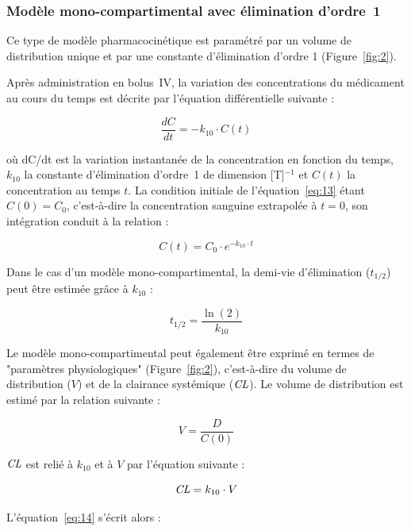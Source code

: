 \subsubsection{Modèle mono-compartimental avec élimination d'ordre~1}
Ce type de modèle pharmacocinétique est paramétré par un volume de distribution unique et par une constante d'élimination d'ordre 1 (Figure~\ref{fig:2}).

Après administration en bolus~IV, la variation des concentrations du médicament au cours du temps est décrite par l'équation différentielle suivante :

\begin{equation}
\frac{dC}{dt} = -k_{10} \cdot C(t)
\label{eq:13}
\end{equation}

où dC/dt est la variation instantanée de la concentration en fonction du temps, $k_{10}$ la constante d'élimination d'ordre~1 de dimension [T]$^{-1}$ et $C(t)$ la concentration au temps $t$. La condition initiale de l'équation~\ref{eq:13} étant $C(0) = C_0$, c'est-à-dire la concentration sanguine extrapolée à $t = 0$, son intégration conduit à la relation :

\begin{equation}
C(t) = C_0 \cdot e^{-k_{10}\cdot t}
\label{eq:14}
\end{equation}

Dans le cas d'un modèle mono-compartimental, la demi-vie d'élimination ($t_{1/2}$) peut être estimée grâce à $k_{10}$ :

\begin{equation}
t_{1/2} = \frac{\ln(2)}{k_{10}}
\label{eq:15}
\end{equation}

Le modèle mono-compartimental peut également être exprimé en termes de "paramètres physiologiques" (Figure~\ref{fig:2}), c'est-à-dire du volume de distribution ($V$) et de la clairance systémique ($\operatorname{\textit{CL}}$). Le volume de distribution est estimé par la relation suivante :

\begin{equation}
V = \frac{D}{C(0)}
\label{eq:16}
\end{equation}

$\operatorname{\textit{CL}}$ est relié à $k_{10}$ et à $V$ par l'équation suivante :

\begin{equation}
\operatorname{\textit{CL}} = k_{10} \cdot V
\label{eq:17}
\end{equation}

L'équation~\ref{eq:14} s'écrit alors :

